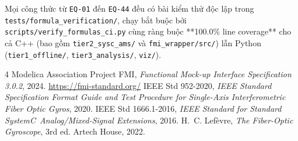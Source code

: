 \documentclass[11pt, a4paper]{article}
\begin{document}
Mọi công thức từ \texttt{EQ-01} đến \texttt{EQ-44} đều có bài kiểm thử độc lập trong \texttt{tests/formula\_verification/}, chạy bắt buộc bởi \texttt{scripts/verify\_formulas\_ci.py} cùng ràng buộc **100.0\% line coverage** cho cả C++ (bao gồm \texttt{tier2\_sysc\_ams/} và \texttt{fmi\_wrapper/src/}) lẫn Python (\texttt{tier1\_offline/}, \texttt{tier3\_analysis/}, \texttt{viz/}).

\begin{thebibliography}{4}
 Modelica Association Project FMI, \emph{Functional Mock-up Interface Specification 3.0.2}, 2024. \url{https://fmi-standard.org/}
 IEEE Std 952-2020, \emph{IEEE Standard Specification Format Guide and Test Procedure for Single-Axis Interferometric Fiber Optic Gyros}, 2020.
 IEEE Std 1666.1-2016, \emph{IEEE Standard for Standard SystemC\textregistered\ Analog/Mixed-Signal Extensions}, 2016.
 H.~C. Lefèvre, \emph{The Fiber-Optic Gyroscope}, 3rd ed. Artech House, 2022.
\end{thebibliography}
\end{document}
